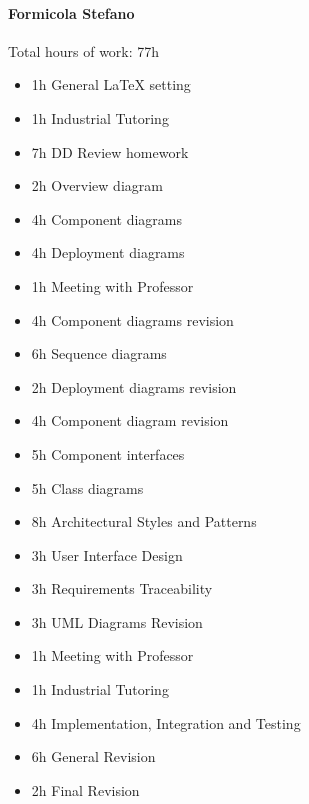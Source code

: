 \documentclass{report}
\begin{document}
		\paragraph{Formicola Stefano} Total hours of work: 77h
			\begin{itemize}
				\item 1h General LaTeX setting
				\item 1h Industrial Tutoring
				\item 7h DD Review homework
				\item 2h Overview diagram
				\item 4h Component diagrams
				\item 4h Deployment diagrams
				\item 1h Meeting with Professor
				\item 4h Component diagrams revision
				\item 6h Sequence diagrams
				\item 2h Deployment diagrams revision
				\item 4h Component diagram revision
				\item 5h Component interfaces
				\item 5h Class diagrams
				\item 8h Architectural Styles and Patterns
				\item 3h User Interface Design
				\item 3h Requirements Traceability
				\item 3h UML Diagrams Revision
				\item 1h Meeting with Professor
				\item 1h Industrial Tutoring
				\item 4h Implementation, Integration and Testing
				\item 6h General Revision
				\item 2h Final Revision
				
			\end{itemize}
\end{document}
